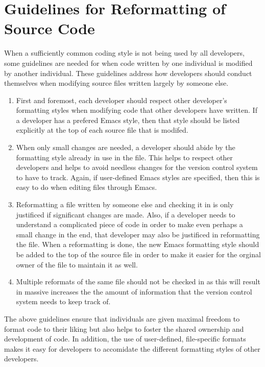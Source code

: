 %
\section{Guidelines for Reformatting of Source Code}
\label{sec:reformatting-guidelines}
%

When a sufficiently common coding style is not being used by all developers,
some guidelines are needed for when code written by one individual is modified
by another individual.  These guidelines address how developers should conduct
themselves when modifying source files written largely by someone else.

\begin{enumerate}

{}\item First and foremost, each developer should respect other developer's
formatting styles when modifying code that other developers have written.  If
a developer has a prefered Emacs style, then that style should be listed
explicitly at the top of each source file that is modifed.

{}\item When only small changes are needed, a developer should abide by the
formatting style already in use in the file.  This helps to respect other
developers and helps to avoid needless changes for the version control system
to have to track.  Again, if user-defined Emacs styles are specified, then
this is easy to do when editing files through Emacs.

{}\item Reformatting a file written by someone else and checking it in is only
justificed if significant changes are made.  Also, if a developer needs to
understand a complicated piece of code in order to make even perhaps a small
change in the end, that developer may also be justificed in reformatting the
file.  When a reformatting is done, the new Emacs formatting style should be
added to the top of the source file in order to make it easier for the orginal
owner of the file to maintain it as well.

{}\item Multiple reformats of the same file should not be checked in as this
will result in massive increases the the amount of information that the
version control system needs to keep track of.

\end{enumerate}

The above guidelines ensure that individuals are given maximal freedom to
format code to their liking but also helps to foster the shared ownership and
development of code.  In addition, the use of user-defined, file-specific
formats makes it easy for developers to accomidate the different formatting
styles of other developers.
